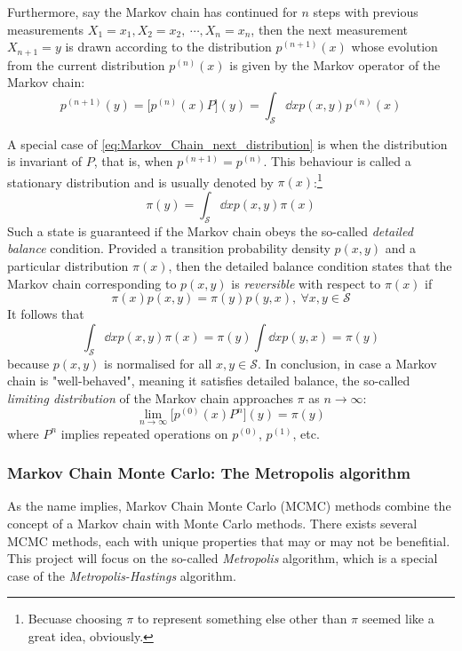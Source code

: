 \documentclass[nofootinbib,reprint,english]{revtex4-1}
\newcommand{\Sspace}{\mathcal{S}}
\begin{document}
Furthermore, say the Markov chain has continued for \(n\) steps with previous measurements \(X_1=x_1,X_2=x_2,\ \cdots,X_n=x_n\), then the next measurement \(X_{n+1}=y\) is drawn according to the distribution \(p^{(n+1)}(x)\) whose evolution from the current distribution \(p^{(n)}(x)\) is given by the Markov operator of the Markov chain:
\begin{equation}\label{eq:Markov_Chain_next_distribution}
p^{(n+1)}(y)=\big[p^{(n)}(x)P\big](y)=\int_\Sspace\dd{x}p(x,y)p^{(n)}(x)
\end{equation}

A special case of \eqref{eq:Markov_Chain_next_distribution} is when the distribution is invariant of \(P\), that is, when \(p^{(n+1)}=p^{(n)}\). This behaviour is called a stationary distribution and is usually denoted by \(\pi(x)\):\footnote{Becuase choosing \(\pi\) to represent something else other than \(\pi\) seemed like a great idea, obviously.}
\begin{equation}
\pi(y)=\int_\Sspace\dd{x}p(x,y)\pi(x)
\end{equation}
Such a state is guaranteed if the Markov chain obeys the so-called \emph{detailed balance} condition. Provided a transition probability density \(p(x,y)\) and a particular distribution \(\pi(x)\), then the detailed balance condition states that the Markov chain corresponding to \(p(x,y)\) is \emph{reversible} with respect to \(\pi(x)\) if
\begin{equation}\label{eq:Markov_Chain_detailed_balance}
\pi(x)p(x,y)=\pi(y)p(y,x),\ \forall x,y\in\Sspace
\end{equation}
It follows that
\[\int_\Sspace\dd{x}p(x,y)\pi(x)=\pi(y)\int\dd{x}p(y,x)=\pi(y)\]
because \(p(x,y)\) is normalised for all \(x,y\in\Sspace\). In conclusion, in case a Markov chain is "well-behaved", meaning it satisfies detailed balance, the so-called \emph{limiting distribution} of the Markov chain approaches \(\pi\) as \(n\to\infty\):
\begin{equation}
\lim_{n\to\infty}\big[p^{(0)}(x)P^n\big](y)=\pi(y)
\end{equation}
where \(P^n\) implies repeated operations on \(p^{(0)}\), \(p^{(1)}\), etc.
\subsubsection{Markov Chain Monte Carlo: The Metropolis algorithm}
As the name implies, Markov Chain Monte Carlo (MCMC) methods combine the concept of a Markov chain with Monte Carlo methods. There exists several MCMC methods, each with unique properties that may or may not be benefitial. This project will focus on the so-called \emph{Metropolis} algorithm, which is a special case of the \emph{Metropolis-Hastings} algorithm.
\end{document}
